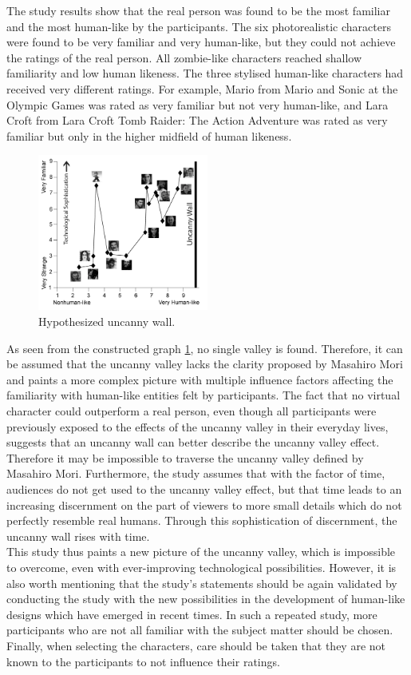 The study results show that the real person was found to be the most familiar and the most human-like by the participants. The six photorealistic characters were found to be very familiar and very human-like, but they could not achieve the ratings of the real person. All zombie-like characters reached shallow familiarity and low human likeness. 
The three stylised human-like characters had received very different ratings. For example, Mario from Mario and Sonic at the Olympic Games was rated as very familiar but not very human-like, and Lara Croft from Lara Croft Tomb Raider: The Action Adventure was rated as very familiar but only in the higher midfield of human likeness. 
\newpage
\begin{figure} %
    \centering
    \includegraphics[width=0.5\textwidth]{graphics/uncanny_wall_graph.png}
    \caption{Hypothesized uncanny wall.}
    \label{fig:uncannyWallGraph}
\end{figure}
As seen from the constructed graph \ref{fig:uncannyWallGraph}, no single valley is found.
Therefore, it can be assumed that the uncanny valley lacks the clarity proposed by Masahiro Mori and paints a more complex picture with multiple influence factors affecting the familiarity with human-like entities felt by participants. The fact that no virtual character could outperform a real person, even though all participants were previously exposed to the effects of the uncanny valley in their everyday lives, suggests that an uncanny wall can better describe the uncanny valley effect. Therefore it may be impossible to traverse the uncanny valley defined by Masahiro Mori. Furthermore, the study assumes that with the factor of time, audiences do not get used to the uncanny valley effect, but that time leads to an increasing discernment on the part of viewers to more small details which do not perfectly resemble real humans. Through this sophistication of discernment, the uncanny wall rises with time.\\
This study thus paints a new picture of the uncanny valley, which is impossible to overcome, even with ever-improving technological possibilities. However, it is also worth mentioning that the study's statements should be again validated by conducting the study with the new possibilities in the development of human-like designs which have emerged in recent times. In such a repeated study, more participants who are not all familiar with the subject matter should be chosen. Finally, when selecting the characters, care should be taken that they are not known to the participants to not influence their ratings.